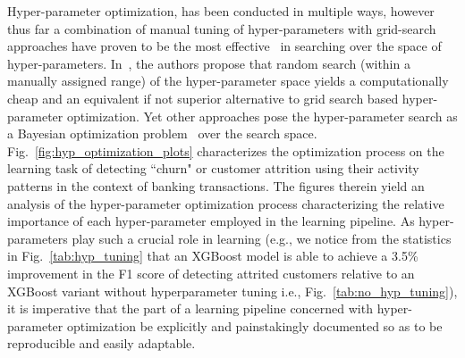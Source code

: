 \fi
Hyper-parameter optimization, has been conducted in multiple ways, however thus far a combination of manual tuning of hyper-parameters with grid-search approaches have proven to be the most effective~\cite{lecun2012efficient,larochelle2007empirical,hinton2012practical} in searching over the space of hyper-parameters. In~\cite{bergstra2012random}, the authors propose that random search (within a manually assigned range) of the hyper-parameter space yields a computationally cheap and an equivalent if not superior alternative to grid search based hyper-parameter optimization. Yet other approaches pose the hyper-parameter search as a Bayesian optimization problem~\cite{joy2016hyperparameter,snoek2012practical} over the search space.
Fig.~\ref{fig:hyp_optimization_plots} characterizes the optimization process on the learning task of detecting ``churn" or customer attrition using their activity patterns in the context of banking transactions. The figures therein yield an analysis of the hyper-parameter optimization process characterizing the relative importance of each hyper-parameter employed in the learning pipeline. As hyper-parameters play such a crucial role in learning (e.g., we notice from the statistics in Fig.~\ref{tab:hyp_tuning} that an XGBoost model is able to achieve a 3.5\% improvement in the F1 score of detecting attrited customers relative to an XGBoost variant without hyperparameter tuning i.e.,  Fig.~\ref{tab:no_hyp_tuning}), it is imperative that the part of a learning pipeline concerned with hyper-parameter optimization be explicitly and painstakingly documented so as to be reproducible and easily adaptable.
